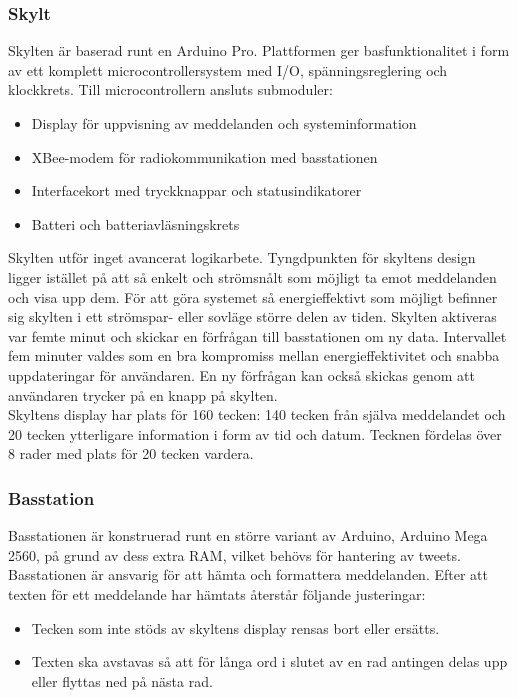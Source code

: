 \documentclass[a4paper,11pt]{article}
\begin{document}
\subsubsection{Skylt}
Skylten är baserad runt en Arduino Pro. Plattformen ger basfunktionalitet i form av ett komplett microcontrollersystem med I/O, spänningsreglering och klockkrets. Till microcontrollern ansluts submoduler:
	
	\begin{itemize}
    	\item Display för uppvisning av meddelanden och systeminformation
    	\item XBee-modem för radiokommunikation med basstationen
    	\item Interfacekort med tryckknappar och statusindikatorer
    	\item Batteri och batteriavläsningskrets
	\end{itemize}
	
Skylten utför inget avancerat logikarbete. Tyngdpunkten för skyltens design ligger istället på att så enkelt och strömsnålt som möjligt ta emot meddelanden och visa upp dem. För att göra systemet så energieffektivt som möjligt befinner sig skylten i ett strömspar- eller sovläge större delen av tiden. Skylten aktiveras var femte minut och skickar en förfrågan till basstationen om ny data. Intervallet fem minuter valdes som en bra kompromiss mellan energieffektivitet och snabba uppdateringar för användaren. En ny förfrågan kan också skickas genom att användaren trycker på en knapp på skylten.\\

Skyltens display har plats för 160 tecken: 140 tecken från själva meddelandet och 20 tecken ytterligare information i form av tid och datum. Tecknen fördelas över 8 rader med plats för 20 tecken vardera.

\subsubsection{Basstation}
Basstationen är konstruerad runt en större variant av Arduino, Arduino Mega 2560, på grund av dess extra RAM, vilket behövs för hantering av tweets. Basstationen är ansvarig för att hämta och formattera meddelanden. Efter att texten för ett meddelande har hämtats återstår följande justeringar:
	
	\begin{itemize}
    	\item Tecken som inte stöds av skyltens display rensas bort eller ersätts.
    	\item Texten ska avstavas så att för långa ord i slutet av en rad antingen delas upp eller flyttas ned på nästa rad.	
	\end{itemize}
	
\end{document}
